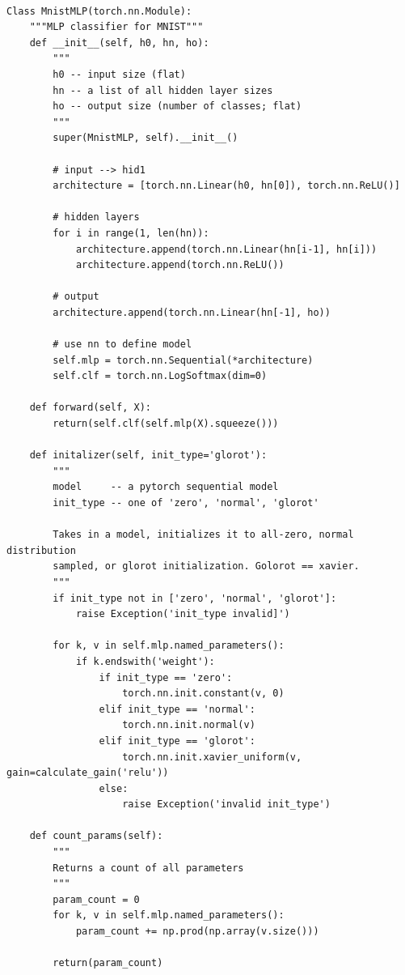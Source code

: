 \documentclass{amsart}
\theoremstyle{definition}
\theoremstyle{remark}
\numberwithin{equation}{section}
\begin{document}
\begin{lstlisting}[breaklines]

Class MnistMLP(torch.nn.Module):
    """MLP classifier for MNIST"""
    def __init__(self, h0, hn, ho):
        """
        h0 -- input size (flat)
        hn -- a list of all hidden layer sizes
        ho -- output size (number of classes; flat)
        """
        super(MnistMLP, self).__init__()

        # input --> hid1
        architecture = [torch.nn.Linear(h0, hn[0]), torch.nn.ReLU()]

        # hidden layers
        for i in range(1, len(hn)):
            architecture.append(torch.nn.Linear(hn[i-1], hn[i]))
            architecture.append(torch.nn.ReLU())

        # output
        architecture.append(torch.nn.Linear(hn[-1], ho))

        # use nn to define model
        self.mlp = torch.nn.Sequential(*architecture)
        self.clf = torch.nn.LogSoftmax(dim=0)

    def forward(self, X):
        return(self.clf(self.mlp(X).squeeze()))

    def initalizer(self, init_type='glorot'):
        """
        model     -- a pytorch sequential model
        init_type -- one of 'zero', 'normal', 'glorot'

        Takes in a model, initializes it to all-zero, normal distribution
        sampled, or glorot initialization. Golorot == xavier.
        """
        if init_type not in ['zero', 'normal', 'glorot']:
            raise Exception('init_type invalid]')

        for k, v in self.mlp.named_parameters():
            if k.endswith('weight'):
                if init_type == 'zero':
                    torch.nn.init.constant(v, 0)
                elif init_type == 'normal':
                    torch.nn.init.normal(v)
                elif init_type == 'glorot':
                    torch.nn.init.xavier_uniform(v, gain=calculate_gain('relu'))
                else:
                    raise Exception('invalid init_type')

    def count_params(self):
        """
        Returns a count of all parameters
        """
        param_count = 0
        for k, v in self.mlp.named_parameters():
            param_count += np.prod(np.array(v.size()))

        return(param_count)

\end{lstlisting}
\end{document}

